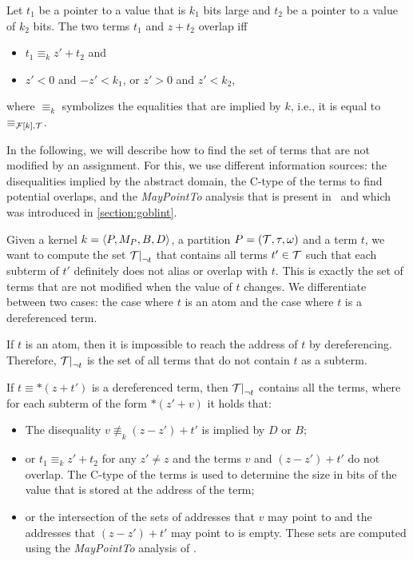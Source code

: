 Let $t_1$ be a pointer to a value that is $k_1$ bits large and $t_2$ be a pointer to a value of $k_2$ bits.
The two terms $t_1$ and $z + t_2$ overlap iff
\begin{itemize}
	\item $t_1 \equiv_{k} z' + t_2$  and
	\item $z' < 0$ and $-z' < k_1$, or $z' > 0$ and $z' < k_2$,
\end{itemize}
where $\equiv_{k}$ symbolizes the equalities that are implied by $k$, i.e.,
it is equal to $\equiv_{\mathcal{F}[k],\mathcal{T}}$.

In the following, we will describe how to find the set of terms
that are not modified by an assignment.
For this, we use different information sources: the disequalities implied by the abstract domain, the C-type of the terms to find potential overlaps, and the \emph{MayPointTo} analysis that is present in \goblint\ and which was introduced in \cref{section:goblint}.

Given a kernel $k = \langle P, M_P, B, D\rangle$, a partition $P = (\mathcal{T}, \tau, \omega)$ and a term $t$,
we want to compute the set $\restr{\T}{\neg t}$ that contains all terms $t' \in \mathcal{T}$ such that each subterm of $t'$ definitely does not alias or overlap with $t$.
This is exactly the set of terms that are not modified when the value of $t$ changes.
We differentiate between two cases: the case where $t$ is an atom and the case where $t$ is a dereferenced term.

If $t$ is an atom, then it is impossible to reach the address of $t$ by dereferencing.
Therefore, $\restr{\T}{\neg t}$ is the set of all terms that do not contain $t$ as a subterm.

If $t \equiv *(z + t')$ is a dereferenced term, then $\restr{\T}{\neg t}$ contains all the terms, where for each subterm of the form $*(z' + v)$ it holds that:
\begin{itemize}
	\item\label{item:diseqs} The disequality $v \nequiv_k (z - z') + t'$ is implied by $D$ or $B$;
    \item\label{item:eqs} or $t_1 \equiv_k z' + t_2$ for any $z' \neq z$ and the terms $v$ and $(z - z') + t'$ do not overlap. The C-type of the terms is used to determine the size in bits of the value that is stored at the address of the term;
    \item or the intersection of the sets of addresses that $v$ may point to and the addresses that $(z - z') + t'$ may point to is empty.
    These sets are computed using the \emph{MayPointTo} analysis of \goblint.
\end{itemize}

